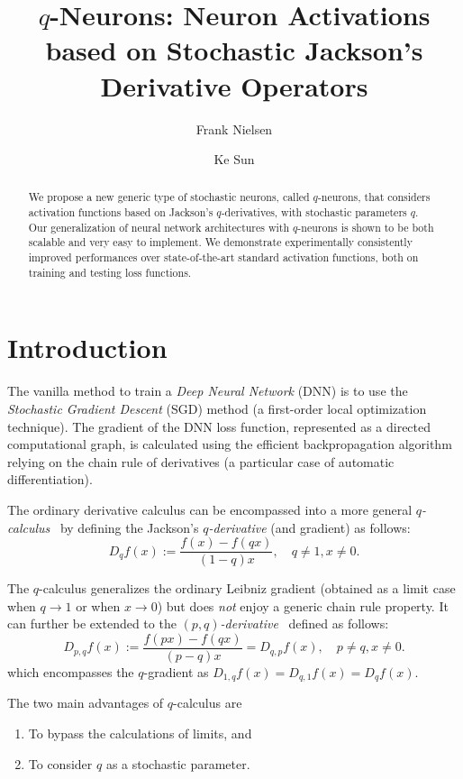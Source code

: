\documentclass{article}
\title{$q$-Neurons: Neuron Activations based on Stochastic Jackson's Derivative Operators}
\author[$\star$]{Frank Nielsen}
\affil[$\star$]{Sony Computer Science Laboratories, Inc.}
\affil[$\star$]{Japan}
\affil[$\star$]{{\small\tt Frank.Nielsen@acm.org}}
\author[$\dagger$]{Ke Sun}
\affil[$\dagger$]{Data61}
\affil[$\dagger$]{Australia}
\affil[$\dagger$]{{\small\tt Ke.Sun@data61.csiro.au}}
\date{}
\def\eqdef{:=}
\begin{document}
\maketitle

\begin{abstract}
We propose a new generic type of stochastic neurons, called $q$-neurons, that considers activation functions based on Jackson's $q$-derivatives, with stochastic parameters $q$.
Our generalization of neural network architectures with $q$-neurons is shown to be both scalable and very easy to implement.
We demonstrate experimentally consistently improved performances over state-of-the-art standard activation functions, both on training and testing loss functions.
\end{abstract}

\section{Introduction}

The vanilla method to train a {\em Deep Neural Network} (DNN) is to use the {\em Stochastic Gradient Descent} (SGD) method
(a first-order local optimization technique). The gradient of the DNN loss function, represented as a directed
computational graph, is calculated using the efficient backpropagation algorithm relying on the chain rule of
derivatives (a particular case of automatic differentiation).

The ordinary derivative calculus can be encompassed into a more general {\em $q$-calculus}~\cite{Jackson-1909,qbook-2001} by defining the Jackson's {\em $q$-derivative} (and gradient) as follows:
\begin{equation}
D_{q} f(x) \eqdef    \frac{f(x)-f(qx)}{(1-q)x},\quad q\neq1, x\neq0.
\end{equation}

	The $q$-calculus generalizes the ordinary Leibniz gradient (obtained as a limit case when $q\rightarrow 1$ or when $x\rightarrow 0$) but does  {\em not} enjoy a generic chain rule property.
It can  further be extended to the {\em $(p,q)$-derivative}~\cite{pq-2013,khan18} defined as follows:
\begin{equation}
D_{p,q} f(x) \eqdef  \frac{f(px)-f(qx)}{(p-q)x}=D_{q,p} f(x) ,\quad p\neq{q}, x\neq0.
\end{equation}
which encompasses the $q$-gradient as $D_{1,q}f(x) = D_{q,1}f(x) = D_{q}f(x)$.

The two main advantages of $q$-calculus are
\begin{enumerate}
\item To bypass the calculations of limits, and
\item To consider $q$ as a stochastic parameter.
\end{enumerate}
\end{document}
